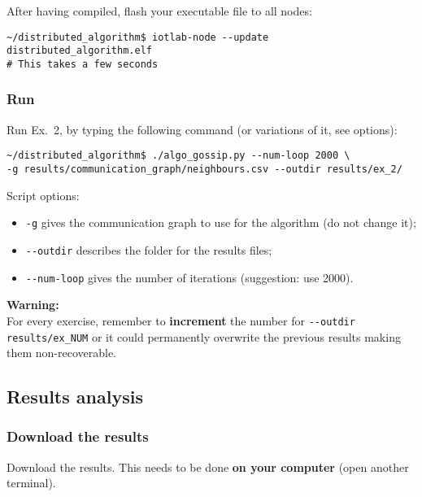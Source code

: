 \documentclass[oneside]{article}
\begin{document}
After having compiled, flash your executable file to all nodes:
    \begin{verbatim}~/distributed_algorithm$ iotlab-node --update distributed_algorithm.elf
# This takes a few seconds
\end{verbatim}

\subsubsection{Run} %
Run Ex.~2, by typing the following command (or variations of it, see options):


\begin{verbatim}
~/distributed_algorithm$ ./algo_gossip.py --num-loop 2000 \
-g results/communication_graph/neighbours.csv --outdir results/ex_2/
\end{verbatim}



Script options:
\begin{itemize}
	\item \verb=-g= gives the communication graph to use for the algorithm (do not change it);
	\item \verb=--outdir= describes the folder for the results files;
    \item \verb=--num-loop=  gives the number of iterations (suggestion: use 2000).
\end{itemize}

\textbf{Warning:} \\
For every exercise, remember to \textbf{increment} the number for \verb=--outdir results/ex_NUM=
or it could permanently overwrite the previous results making them non-recoverable.




\subsection{Results analysis}
\subsubsection{Download the results}
Download the results. This needs to be done \textbf{on your computer} (open another terminal).
\end{document}

